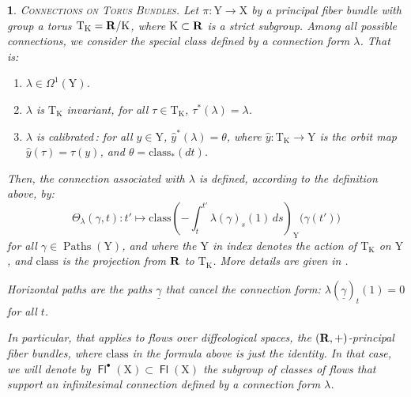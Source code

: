 \documentclass[12pt,reqno]{amsart}
\theoremstyle{article}
\newtheorem{article}{}
\def\artlabel[#1]{\textsc{#1}.}
\def \K{\mathrm K}
\def \T{\mathrm T}
\def \X{\mathrm X}
\def \Y{\mathrm Y}
\newcommand{\RR}{{\bf R}}
\newcommand{\class}{\mathrm{class}}
\newcommand{\ds}{{d\!s}}
\newcommand{\dt}{{d\!t}}
\DeclareMathOperator{\Fl}{\mathsf{Fl}}
\DeclareMathOperator{\Paths}{Paths}
\begin{document}
  \begin{article}\artlabel[Connections on Torus Bundles]
    Let $\pi \colon \Y \to \X$ by a principal fiber bundle with group a torus $\T_\K = \RR/\K$,
    where $\K \subset \RR$ is a strict subgroup.
    Among all possible connections,
    we consider the special class defined by a \emph{connection form} $\lambda$.
    That is:
    
    \begin{enumerate}
      \item[1.] $\lambda \in \Omega^1(\Y)$.
      \item[2.] $\lambda$ is $\T_\K$ invariant,
      for all $\tau \in \T_\K$,
      $\tau^*(\lambda) = \lambda$.
      \item[3.] $\lambda$ is \emph{calibrated}\,:
      for all $y \in \Y$,
      $\hat y^*(\lambda) = \theta$,
      where $\hat y \colon \T_\K \to \Y$ is the orbit map $\hat y(\tau) = \tau(y)$,
      and $\theta = \class_*(\dt)$.
    \end{enumerate}
    
    Then,
    the connection associated with $\lambda$ is defined,
    according to the definition above,
    by:
    $$
    \Theta_\lambda(\gamma,t) \colon t' \mapsto \class\left( - \int_t^{t'} \lambda(\gamma)_s(1) \, \ds \right)_\Y \big(\gamma(t')\big)
    $$
    for all $\gamma \in \Paths(\Y)$,
    and where the $\Y$ in index denotes the action of $\T_\K$ on $\Y$,
    and $\class$ is the projection from $\RR$ to $\T_\K$.
    More details are given in \cite[]{PIZ13}.
    
    Horizontal paths are the paths $\underline\gamma$ that cancel the connection form:
    $\lambda(\underline\gamma)_t(1) = 0$ for all $t$.
    
    In particular,
    that applies to flows over diffeological spaces,
    the $(\RR,+)$-principal fiber bundles,
    where $\class$ in the formula above is just the identity.
    In that case,
    we will denote by $\Fl^\bullet(\X) \subset \Fl(\X)$ the subgroup of classes of flows that support an infinitesimal connection defined by a connection form $\lambda$.
  \end{article}
  
\end{document}
